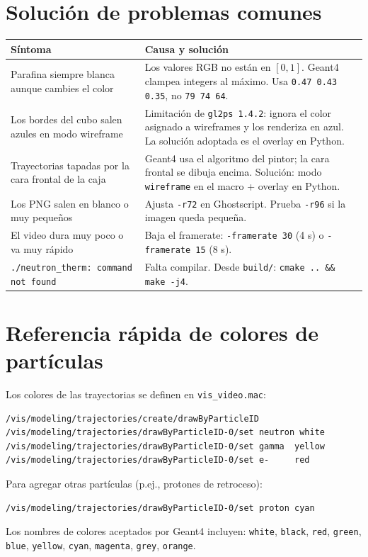 \documentclass[11pt,a4paper]{article}
\begin{document}
\section{Solución de problemas comunes}

\begin{center}
\begin{tabular}{p{4.5cm}p{9.5cm}}
  \toprule
  \textbf{Síntoma} & \textbf{Causa y solución} \\
  \midrule
  Parafina siempre blanca aunque cambies el color
    & Los valores RGB no están en $[0,1]$. Geant4 clampea integers al máximo.
      Usa \texttt{0.47 0.43 0.35}, no \texttt{79 74 64}. \\
  \addlinespace
  Los bordes del cubo salen azules en modo wireframe
    & Limitación de \texttt{gl2ps 1.4.2}: ignora el color asignado a wireframes
      y los renderiza en azul. La solución adoptada es el overlay en Python. \\
  \addlinespace
  Trayectorias tapadas por la cara frontal de la caja
    & Geant4 usa el algoritmo del pintor; la cara frontal se dibuja encima.
      Solución: modo \texttt{wireframe} en el macro + overlay en Python. \\
  \addlinespace
  Los PNG salen en blanco o muy pequeños
    & Ajusta \texttt{-r72} en Ghostscript. Prueba \texttt{-r96} si la imagen
      queda pequeña. \\
  \addlinespace
  El video dura muy poco o va muy rápido
    & Baja el framerate: \texttt{-framerate 30} (4 s) o \texttt{-framerate 15} (8 s). \\
  \addlinespace
  \texttt{./neutron\_therm: command not found}
    & Falta compilar. Desde \texttt{build/}: \texttt{cmake .. \&\& make -j4}. \\
  \bottomrule
\end{tabular}
\end{center}

\section{Referencia rápida de colores de partículas}

Los colores de las trayectorias se definen en \texttt{vis\_video.mac}:

\begin{lstlisting}[style=macro]
/vis/modeling/trajectories/create/drawByParticleID
/vis/modeling/trajectories/drawByParticleID-0/set neutron white
/vis/modeling/trajectories/drawByParticleID-0/set gamma  yellow
/vis/modeling/trajectories/drawByParticleID-0/set e-     red
\end{lstlisting}

Para agregar otras partículas (p.ej., protones de retroceso):
\begin{lstlisting}[style=macro]
/vis/modeling/trajectories/drawByParticleID-0/set proton cyan
\end{lstlisting}

Los nombres de colores aceptados por Geant4 incluyen:
\texttt{white}, \texttt{black}, \texttt{red}, \texttt{green}, \texttt{blue},
\texttt{yellow}, \texttt{cyan}, \texttt{magenta}, \texttt{grey}, \texttt{orange}.
\end{document}
